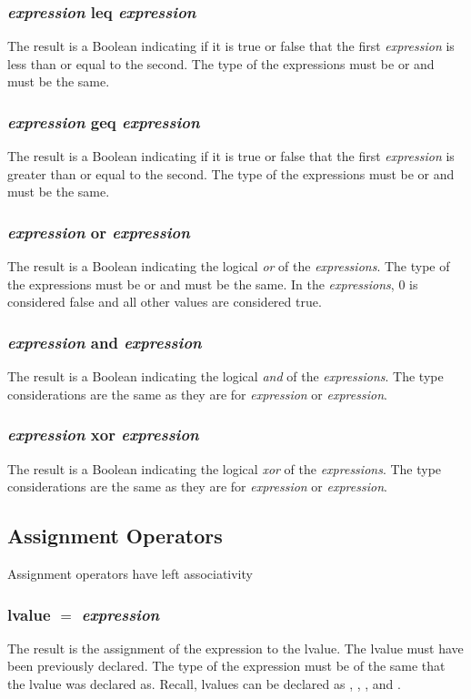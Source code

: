\subsubsection{\textit{expression} leq \textit{expression}}
The result is a Boolean indicating if it is true or false that the first \textit{expression} is less than  or equal to the second. The type of the expressions must be \integ or \float and must be the same.  
\subsubsection{\textit{expression} geq \textit{expression}}
The result is a Boolean indicating if it is true or false that the first \textit{expression} is greater than or equal to the second. The type of the expressions must be \integ or \float and must be the same.  
\subsubsection{\textit{expression} or \textit{expression}}
The result is a Boolean indicating the logical \textit{or} of the \textit{expressions}. The type of the expressions must be \integ or \float and must be the same. In the \textit{expressions}, 0 is considered \textsf{false} and all other values are considered \textsf{true}.
\subsubsection{\textit{expression} and \textit{expression}}
The result is a Boolean indicating the logical \textit{and} of the \textit{expressions}. The type considerations are the same as they are for \textit{expression} or \textit{expression}.
\subsubsection{\textit{expression} xor \textit{expression}}
The result is a Boolean indicating the logical \textit{xor} of the \textit{expressions}. The type considerations are the same as they are for \textit{expression} or \textit{expression}.
\subsection{Assignment Operators}
Assignment operators have left associativity
\subsubsection{lvalue $=$ \textit{expression}}
The result is the assignment of the expression to the lvalue. The lvalue must have been previously declared. The type of the expression must be of the same that the lvalue was declared as. Recall, lvalues can be declared as \integ, \float, \complex, and \mat.

